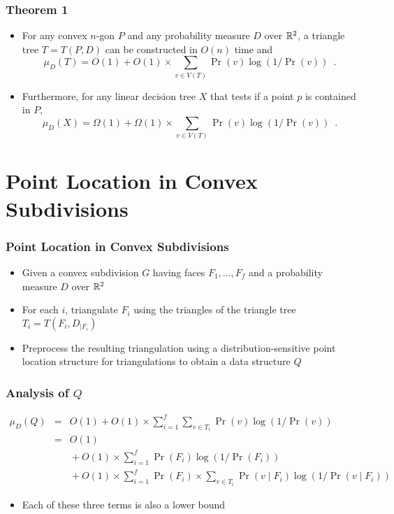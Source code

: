 \documentclass{beamer}
\begin{document}
\frame
{
	\frametitle{Theorem 1}
	\begin{itemize}
	\item<1-> For any convex $n$-gon $P$ and
any probability measure $D$ over $\mathbb{R}^2$, a triangle tree $T=T(P,D)$ can be
constructed in $O(n)$ time and 
\[
	\mu_D(T) = O(1) + O(1)\times\sum_{v\in V(T)} \Pr(v)\log(1/\Pr(v))
\enspace .
\]

	\item<2-> Furthermore, for any linear decision tree $X$ that
	tests if a point $p$ is contained in $P$,
	\[
	\mu_D(X) = \Omega(1) + \Omega(1)\times\sum_{v\in V(T)}
	\Pr(v)\log(1/\Pr(v)) \enspace .
	\]
	\end{itemize}
}


\section{Point Location in Convex Subdivisions}
\frame
{
	\frametitle{Point Location in Convex Subdivisions}

	\begin{itemize}
	\item<1-> Given a convex subdivision $G$ having faces
$F_1,\ldots,F_f$ and a probability measure $D$ over $\mathbb{R}^2$

	\item<2-> For each $i$, triangulate $F_i$ using the triangles of
the triangle tree $T_i=T(F_i,D_{\mid F_i})$

	\item<3-> Preprocess the resulting triangulation using a
distribution-sensitive point location structure for triangulations to
obtain a data structure $Q$

	\end{itemize}
}

\frame
{
	\frametitle{Analysis of $Q$}

	\begin{eqnarray*}
	\mu_D(Q) & = & O(1)+O(1)\times\sum_{i=1}^f\sum_{v\in
T_i}\Pr(v)\log(1/\Pr(v)) \\
	         & = & O(1) \\ & & {}+O(1)\times\sum_{i=1}^f\Pr(F_i)\log
(1/\Pr(F_i)) \\ & & {}+ O(1)\times\sum_{i=1}^f\Pr(F_i)\times\sum_{v\in T_i}\Pr(v\mid
F_i)\log(1/\Pr(v\mid F_i))
	\end{eqnarray*}
	\begin{itemize}
	\item<2->Each of these three terms is also a lower bound
	\end{itemize}
}
\end{document}
